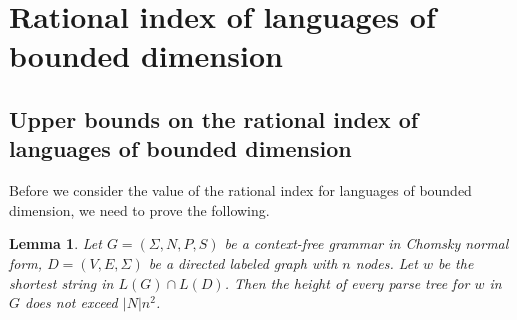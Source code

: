 \documentclass[11pt,a4paper]{article} %
\newtheorem{lemma}{Lemma}
\begin{document}
\section{Rational index of languages of bounded dimension}
\label{sec:osc}
\subsection{Upper bounds on the rational index of languages of bounded dimension}
Before we consider the value of the rational index for languages of bounded dimension, we need to prove the following.
\begin{lemma}
\label{lem:treeheight}
Let  $G = (\Sigma, N, P, S)$ be a context-free grammar in Chomsky normal form,  $D=(V, E, \Sigma)$ be a directed labeled graph with $n$ nodes. Let $w$ be the shortest string in $L(G)\cap L(D)$. Then the height of every parse tree for $w$ in $G$ does not exceed $|N|n^2$.
\end{lemma}
\end{document}
